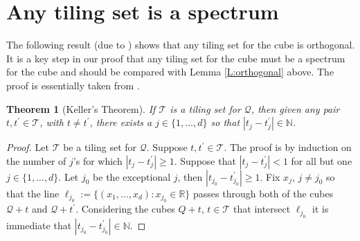 \documentclass[12pt]{amsart}
\theoremstyle{plain}
\newtheorem{theorem}{Theorem}[section]
\numberwithin{equation}{section}
\newcommand{\Q}{\ensuremath{\mathcal{Q}}\xspace}
\newcommand{\T}{\ensuremath{\mathcal{T}}\xspace}
\newcommand{\R}{\ensuremath{\mathbb{R}}\xspace}
\newcommand{\N}{\ensuremath{\mathbb{N}}\xspace}
\begin{document}
\section{Any tiling set is a spectrum}\label{S:tiling}
The following result (due to \cite{Kel1})
shows that any tiling set for the cube is
orthogonal. It is a key step in our proof that any tiling set for the
cube must be a spectrum for the cube and should be compared with
Lemma \ref{L:orthogonal} above.
The proof is essentially taken from \cite{Per1}.
\begin{theorem}[Keller's Theorem]\label{T:keller}
   If \T is a tiling set for \Q, then given any pair
   $t,t^{\prime}\in\T$, with $t\neq t^{\prime}$, there exists a
   $j\in\{1,\ldots,d\}$ so that $|t_j-t^{\prime}_j|\in\N$.
\end{theorem}
\begin{proof}
   Let \T be a tiling set for \Q. Suppose $t,t^{\prime}\in\T$.
   The proof is by induction on the number of $j$'s for which
   $|t_{j}-t_{j}^{\prime}|\geq 1$. Suppose
   that $|t_j-t_j^{\prime}|<1$ for all but one $j\in\{1,\ldots,d\}$.
   Let $j_0$ be the exceptional $j$, then
   $|t_{j_0}-t_{j_0}^{\prime}|\geq 1$. Fix $x_j$, $j\neq j_0$ so
   that the line $\ell_{j_0}:=\{(x_1,\ldots,x_d):x_{j_0}\in\R\}$
   passes through both of the cubes $\Q+t$ and $\Q+t^{\prime}$.
   Considering the cubes $Q+t$, $t\in\T$ that intersect $\ell_{j_0}$
   it is immediate that $|t_{j_0}-t_{j_0}^{\prime}|\in\N$.
 

\end{proof}
\end{document}
